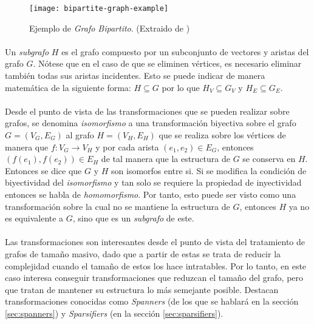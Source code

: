 \documentclass{subfiles}
\begin{document}
      \begin{figure}
        \centering
        \texttt{[image: bipartite-graph-example]}
        \caption{Ejemplo de \emph{Grafo Bipartito}. (Extraido de \cite{wiki:Graph_(discrete_mathematics)})}
        \label{img:bipartite_graph_example}
      \end{figure}

      \paragraph{}
      Un \emph{subgrafo} $H$ es el grafo compuesto por un subconjunto de vectores y aristas del grafo $G$. Nótese que en el caso de que se eliminen vértices, es necesario eliminar también todas sus aristas incidentes. Esto se puede indicar de manera matemática de la siguiente forma: $H \subseteq G$ por lo que $H_V \subseteq G_V$ y $H_E \subseteq G_E$.

      \paragraph{}
      Desde el punto de vista de las transformaciones que se pueden realizar sobre grafos, se denomina \emph{isomorfismo} a una transformación biyectiva sobre el grafo $G =(V_G, E_G)$ al grafo $H = (V_H, E_H)$ que se realiza sobre los vértices de manera que $f: V_G \rightarrow V_H$ y por cada arista $(e_1, e_2) \in E_G$, entonces $(f(e_1), f(e_2)) \in E_H$ de tal manera que la estructura de $G$ se conserva en $H$. Entonces se dice que $G$ y $H$ son isomorfos entre si. Si se modifica la condición de biyectividad del \emph{isomorfismo} y tan solo se requiere la propiedad de inyectividad entonces se habla de \emph{homomorfismo}. Por tanto, esto puede ser visto como una transformación sobre la cual no se mantiene la estructura de $G$, entonces $H$ ya no es equivalente a $G$, sino que es un \emph{subgrafo} de este.

      \paragraph{}
      Las transformaciones son interesantes desde el punto de vista del tratamiento de grafos de tamaño masivo, dado que a partir de estas se trata de reducir la complejidad cuando el tamaño de estos los hace intratables. Por lo tanto, en este caso interesa conseguir transformaciones que reduzcan el tamaño del grafo, pero que tratan de mantener su estructura lo más semejante posible. Destacan transformaciones conocidas como \emph{Spanners} (de los que se hablará en la sección \ref{sec:spanners}) y \emph{Sparsifiers} (en la sección \ref{sec:sparsifiers}).
\end{document}
